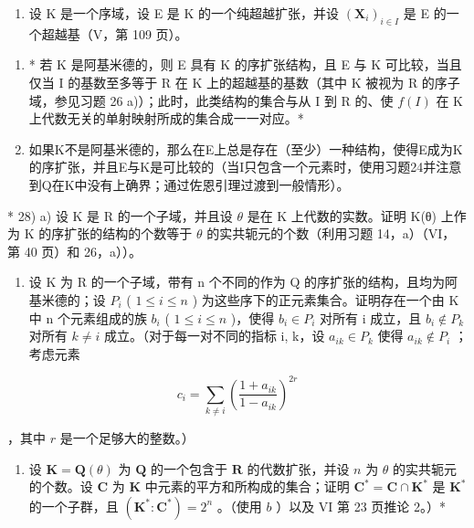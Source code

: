 \begin{enumerate}
\def\labelenumi{\arabic{enumi})}
\setcounter{enumi}{26}
\tightlist
\item
  设 K 是一个序域，设 E 是 K 的一个纯超越扩张，并设 \((\mathbf{X}_{i})_{i\in I}\) 是 E 的一个超越基（V，第 109 页）。
\end{enumerate}

\begin{enumerate}
\def\labelenumi{\alph{enumi})}
\item
  * 若 K 是阿基米德的，则 E 具有 K 的序扩张结构，且 E 与 K 可比较，当且仅当 I 的基数至多等于 R 在 K 上的超越基的基数（其中 K 被视为 R 的序子域，参见习题 26 a)）；此时，此类结构的集合与从 I 到 R 的、使 \(f(I)\) 在 K 上代数无关的单射映射所成的集合成一一对应。*
\item
  如果K不是阿基米德的，那么在E上总是存在（至少）一种结构，使得E成为K的序扩张，并且E与K是可比较的（当I只包含一个元素时，使用习题24并注意到Q在K中没有上确界；通过佐恩引理过渡到一般情形）。
\end{enumerate}

* 28) a) 设 K 是 R 的一个子域，并且设 \(\theta\) 是在 K 上代数的实数。证明 K(θ) 上作为 K 的序扩张的结构的个数等于 \(\theta\) 的实共轭元的个数（利用习题 14，a）（VI，第 40 页）和 26，a））。

\begin{enumerate}
\def\labelenumi{\alph{enumi})}
\setcounter{enumi}{1}
\tightlist
\item
  设 K 为 R 的一个子域，带有 n 个不同的作为 Q 的序扩张的结构，且均为阿基米德的；设 \(P_{i}\) ( \(1 \leqslant i \leqslant n\) ) 为这些序下的正元素集合。证明存在一个由 K 中 n 个元素组成的族 \(b_{i}\) ( \(1 \leqslant i \leqslant n\) )，使得 \(b_{i} \in P_{i}\) 对所有 i 成立，且 \(b_{i} \notin P_{k}\) 对所有 \(k \neq i\) 成立。（对于每一对不同的指标 i, k，设 \(a_{ik} \in P_{k}\) 使得 \(a_{ik} \notin P_{i}\) ；考虑元素
\end{enumerate}

\[
c _ {i} = \sum_ {k \neq i} \left(\frac {1 + a _ {i k}}{1 - a _ {i k}}\right) ^ {2 r}
\]

，其中 \(r\) 是一个足够大的整数。）

\begin{enumerate}
\def\labelenumi{\alph{enumi})}
\setcounter{enumi}{2}
\tightlist
\item
  设 \(\mathbf{K} = \mathbf{Q}(\theta)\) 为 \(\mathbf{Q}\) 的一个包含于 \(\mathbf{R}\) 的代数扩张，并设 \(n\) 为 \(\theta\) 的实共轭元的个数。设 \(\mathbf{C}\) 为 \(\mathbf{K}\) 中元素的平方和所构成的集合；证明 \(\mathbf{C}^* = \mathbf{C} \cap \mathbf{K}^*\) 是 \(\mathbf{K}^*\) 的一个子群，且 \((\mathbf{K}^*: \mathbf{C}^*) = 2^n\) 。（使用 \(b\) ）以及 VI 第 23 页推论 2。）*
\end{enumerate}

